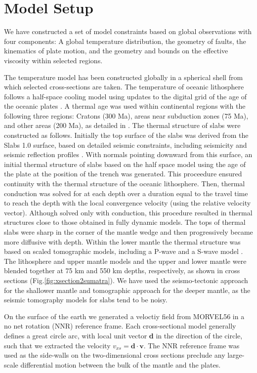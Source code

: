 \documentclass[12pt]{article}
\begin{document}
\section{Model Setup}
We have constructed a set of model constraints based on global observations with four components: A global temperature distribution, the geometry of faults, the kinematics of plate motion, and the geometry and bounds on the effective viscosity within selected regions.

The temperature model has been constructed globally in a spherical shell from which selected cross-sections are taken. The temperature of oceanic lithosphere follows a half-space cooling model using  updates to the digital grid of the age of the oceanic plates \citep{muller1997digital}.  
A thermal age was used within continental regions with the following three regions: Cratons (300 Ma), areas near subduction zones (75 Ma), and other areas (200 Ma), as detailed in \citep{Stadler27082010}.
The thermal structure of slabs were constructed as follows. 
Initially the top surface of the slabs was derived from the Slabs 1.0 surface, based on detailed seismic constraints, including seismicity and seismic reflection profiles \citep{Hayes2012}.
With normals pointing downward from this surface, an initial thermal structure of slabs based on the half space model using the age of the plate at the position of the trench was generated. This proceedure ensured continuity with the thermal structure of the oceanic lithosphere. Then, thermal conduction was solved for at each depth over a duration equal to the travel time to reach the depth with the local convergence velocity (using the relative velocity vector). Although solved only with conduction, this procedure resulted in thermal structures close to those obtained in fully dynamic models. The tops of thermal  slabs were sharp in the corner of the mantle wedge and then progressively became more diffusive with depth.
Within the lower mantle the thermal structure was based on scaled tomographic models,
including a P-wave\citep{simmons2012llnl} and a S-wave model \citep{ritsema1999complex}.
The lithosphere and upper mantle models and the upper and lower mantle were blended together at 75 km and 550 km depths, respectively, as shown in cross sections (Fig.\ref{fig:xsection2sumatra}).
We have used the seismo-tectonic approach for the shallower mantle and tomographic approach for the deeper mantle, as the seismic tomography models for slabs tend to be noisy.


On the surface of the earth we generated a veloctiy field from MORVEL56 \citep{GGGE2060} in a no net rotation (NNR) reference frame. Each cross-sectional model generally defines a great circle arc, with local unit vector \textbf{d} in the direction of the circle, such that we extracted the velocity $v_{xs}=\textbf{d}\cdot\textbf{v}$.  The NNR reference frame was used as the side-walls on the two-dimensional cross sections preclude any large-scale differential motion between the bulk of the mantle and the plates.
\end{document}
